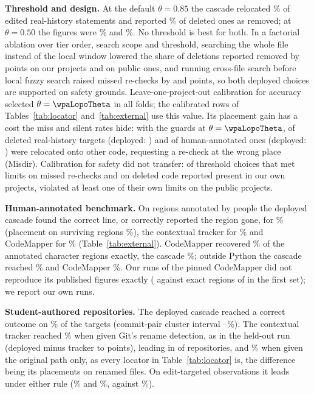 \textbf{Threshold and design.} At the default $\theta=0.85$ the cascade relocated \thetaEditedEightyFive\% of edited real-history statements and reported \thetaGoneEightyFive\% of deleted ones as removed; at $\theta=0.50$ the figures were \thetaEditedFifty\% and \thetaGoneFifty\%. No threshold is best for both. In a factorial ablation over tier order, search scope and threshold, searching the whole file instead of the local window lowered the share of deletions reported removed by \wpaScopeGoneInt{} points on our projects and \wpaScopeGonePub{} on public ones, and running cross-file search before local fuzzy search raised missed re-checks by \wpaOrderMissInt{} and \wpaOrderMissPub{} points, so both deployed choices are supported on safety grounds. Leave-one-project-out calibration for accuracy selected $\theta=\wpaLopoTheta$ in all \wpaLopoFolds{} folds; the calibrated rows of Tables~\ref{tab:locator} and~\ref{tab:external} use this value. Its placement gain has a cost the miss and silent rates hide: with the guards at $\theta=\wpaLopoTheta$, \wiRealCalGiGoneKeptK{} of \wiRealCalGiGoneKeptN{} deleted real-history targets (deployed: \wiRealDepGoneKeptK{}) and \wiHumCalGiGoneKeptK{} of \wiHumCalGiGoneKeptN{} human-annotated ones (deployed: \wiHumDepGoneKeptK{}) were relocated onto other code, requesting a re-check at the wrong place (Misdir). Calibration for safety did not transfer: of \wpaConstrFeasible{} threshold choices that met limits on missed re-checks and on deleted code reported present in our own projects, \wpaConstrViolate{} violated at least one of their own limits on the public projects.



\textbf{Human-annotated benchmark.} On regions annotated by people the deployed cascade found the correct line, or correctly reported the region gone, for \cExtHumDepAcc\% (placement on surviving regions \wiHumDepPlace\%), the contextual tracker for \cExtHumTrkAcc\% and CodeMapper for \cExtHumCmAcc\% (Table~\ref{tab:external}). CodeMapper recovered \cExtHumCmChars\% of the annotated character regions exactly, the cascade \cExtHumDepChars\%; outside Python the cascade reached \cExtHumNpDepAcc\% and CodeMapper \cExtHumNpCmAcc\%. Our runs of the pinned CodeMapper did not reproduce its published figures exactly (\cRepAObserved{} against \cRepAPublished{} exact regions of \cRepAN{} in the first set); we report our own runs.

\textbf{Student-authored repositories.} The deployed cascade reached a correct outcome on \hTwoDepAcc\% of the targets (commit-pair cluster interval \hTwoDepAccLo--\hTwoDepAccHi\%). The contextual tracker reached \hTwoTrkAcc\% when given Git's rename detection, as in the held-out run (deployed minus tracker \hTwoDiffLo{} to \hTwoDiffHi{} points), leading in \hTwoTrkLeadRepos{} of \hTwoRepos{} repositories, and \wiStuTrQAcc\% when given the original path only, as every locator in Table~\ref{tab:locator} is, the difference being its \wiStuTrRenamed{} placements on renamed files. On edit-targeted observations it leads under either rule (\hTwoTrkTgtAcc\% and \wiStuTgtTrQAcc\%, against \hTwoDepTgtAcc\%).

